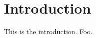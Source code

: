\documentclass[main.tex]{subfiles}
\begin{document}
\section{Introduction}
This is the introduction. Foo.
\end{document}
